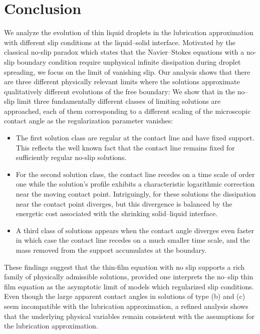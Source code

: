 \documentclass[pagesize,pdftex]{amsart}
\begin{document}
\section{Conclusion} %

We analyze the evolution of thin liquid droplets in the lubrication
approximation with different slip conditions at the liquid--solid
interface. Motivated by the classical no-slip paradox which states that the
Navier–Stokes equations with a no-slip boundary condition require unphysical
infinite dissipation during droplet spreading, we focus on the limit of
vanishing slip.  Our analysis shows that there are three different physically
relevant limits where the solutions approximate qualitatively different
evolutions of the free boundary: We show that in the no--slip limit three
fundamentally different classes of limiting solutions are approached, each of
them corresponding to a different scaling of the microscopic contact angle as
the regularization parameter vanishes:
\begin{itemize}[leftmargin=5ex]
\item[(a)] The first solution class are regular at the contact line and have
  fixed support. This reflects the well known fact that the contact line remains
  fixed for sufficiently regular no-slip solutions.
\item[(b)] For the second solution class, the contact line recedes on a time
  scale of order one while the solution's profile exhibits a characteristic
  logarithmic correction near the moving contact point. Intriguingly, for these
  solutions the dissipation near the contact point diverges, but this divergence
  is balanced by the energetic cost associated with the shrinking solid–liquid
  interface.
\item[(c)] A third class of solutions appears when the contact angle diverges
  even faster in which case the contact line recedes on a much smaller time
  scale, and the mass removed from the support accumulates at the boundary.
\end{itemize}
These findings suggest that the thin-film equation with no slip supports a rich
family of physically admissible solutions, provided one interprets the no--slip
thin film equation as the asymptotic limit of models which regularized slip
conditions. Even though the large apparent contact angles in solutions of type
(b) and (c) seem incompatible with the lubrication approximation, a refined
analysis shows that the underlying physical variables remain consistent with the
assumptions for the lubrication approximation.



\end{document}
